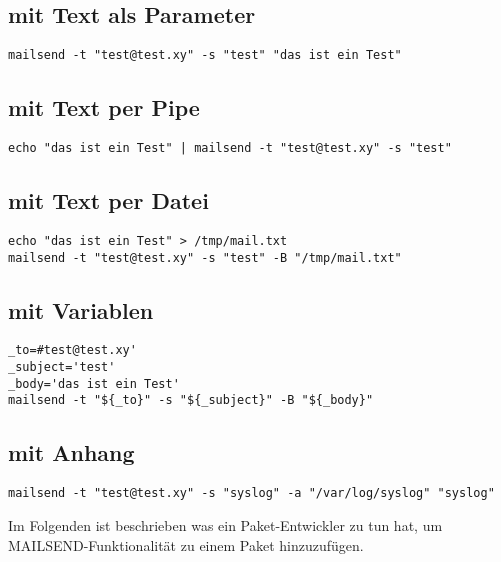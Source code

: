  
\subsection { mit Text als Parameter}
\begin{verbatim}
mailsend -t "test@test.xy" -s "test" "das ist ein Test"
\end{verbatim}

\subsection { mit Text per Pipe}
\begin{verbatim}
echo "das ist ein Test" | mailsend -t "test@test.xy" -s "test"
\end{verbatim}

\subsection { mit Text per Datei}
\begin{verbatim}
echo "das ist ein Test" > /tmp/mail.txt
mailsend -t "test@test.xy" -s "test" -B "/tmp/mail.txt"
\end{verbatim}

\subsection { mit Variablen}
\begin{verbatim}
_to=#test@test.xy'
_subject='test'
_body='das ist ein Test'
mailsend -t "${_to}" -s "${_subject}" -B "${_body}"
\end{verbatim}

\subsection { mit Anhang}
\begin{verbatim}
mailsend -t "test@test.xy" -s "syslog" -a "/var/log/syslog" "syslog"
\end{verbatim}

    Im Folgenden ist beschrieben was ein Paket-Entwickler zu tun hat, 
    um MAILSEND-Funktionalität zu einem Paket hinzuzufügen.
 
